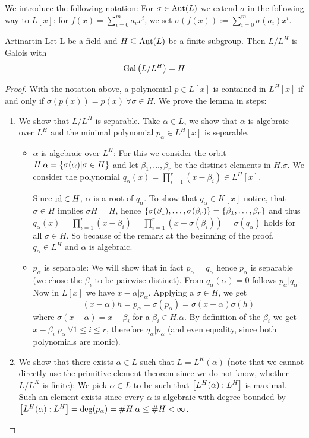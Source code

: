 \documentclass[twoside = false,	%
		headsepline,		%
		parskip = true,
		]{scrbook}						%
\begin{document}
        We introduce the following notation: For $\sigma \in \mathrm{Aut}(L)$ we extend $\sigma$ in the following way to $L[x]$: for $f(x)=\sum_{i=0}^ma_ix^i$, we set $\sigma(f(x)):=\sum_{i=0}^m\sigma(a_i)x^i$.

        \begin{lemma}{Artin}{artin}
            Let L be a field and $H\subseteq\mathrm{Aut}(L)$ be a finite subgroup. Then $L/L^H$ is Galois with $$\mathrm{Gal}\left( L/L^H\right) = H$$
        \end{lemma}
        \begin{proof}
            With the notation above, a polynomial $p\in L[x]$ is contained in $L^H[x]$ if and only if $\sigma(p(x))=p(x)\ \forall\sigma\in H$. We prove the lemma in steps:
            \begin{enumerate}
                \item We show that $L/L^H$ is separable. Take $\alpha\in L$, we show that $\alpha$ is algebraic over $L^H$ and the minimal polynomial $p_\alpha \in L^H[x]$ is separable.
                \begin{itemize}
                    \item $\alpha$ is algebraic over $L^H$: For this we consider the orbit $H.\alpha = \left\{ \sigma(\alpha)|\sigma\in H\right\}$ and let $\beta_1,\dots,\beta_r$ be the distinct elements in $H.\sigma$. We consider the polynomial $q_\alpha(x)=\prod_{i=1}^r(x-\beta_i)\in L^H[x]$.

                    Since $\mathrm{id}\in H$, $\alpha$ is a root of $q_\alpha$. To show that $q_\alpha\in K[x]$ notice, that $\sigma\in H$ implies $\sigma H=H$, hence $\left\{ \sigma(\beta_1),\dots,\sigma(\beta_r)\right\}=\left\{ \beta_1,\dots,\beta_r\right\}$ and thus
                    $q_\alpha(x)=\prod_{i=1}^r(x-\beta_i)=\prod_{i=1}^r(x-\sigma(\beta_i))=\sigma(q_\alpha)$ holds for all $\sigma\in H$. So because of the remark at the beginning of the proof, $q_\alpha\in L^H$ and $\alpha$ is algebraic.
                    \item $p_\alpha$ is separable: We will show that in fact $p_\alpha=q_\alpha$ hence $p_\alpha$ is separable (we chose the $\beta_i$ to be pairwise distinct). From $q_\alpha(\alpha)=0$ follows $p_\alpha|q_\alpha$. Now in $L[x]$ we have  $x-\alpha|p_\alpha$. Applying a $\sigma\in H$, we get $$(x-\alpha)h=p_\alpha=\sigma(p_\alpha)=\sigma(x-\alpha)\sigma(h)$$
                    where $\sigma(x-\alpha)=x-\beta_i$ for a $\beta_i\in H.\alpha$. By definition of the $\beta_i$ we get $x-\beta_i|p_\alpha\ \forall1\leq i\leq r$, therefore $q_\alpha|p_\alpha$ (and even equality, since both polynomials are monic).
                \end{itemize}
                \item We show that there exists $\alpha\in L$ such that $L=L^K(\alpha)$ (note that we cannot directly use the primitive element theorem since we do not know, whether $L/L^K$ is finite):
                We pick $\alpha\in L$ to be such that $\left[ L^H(\alpha):L^H\right]$ is maximal. Such an element exists since every $\alpha$ is algebraic with degree bounded by $\left[ L^H(\alpha):L^H\right]=\deg(p_\alpha)=\#H.\alpha\leq\#H<\infty$.
                

\end{enumerate}
\end{proof}
\end{document}
